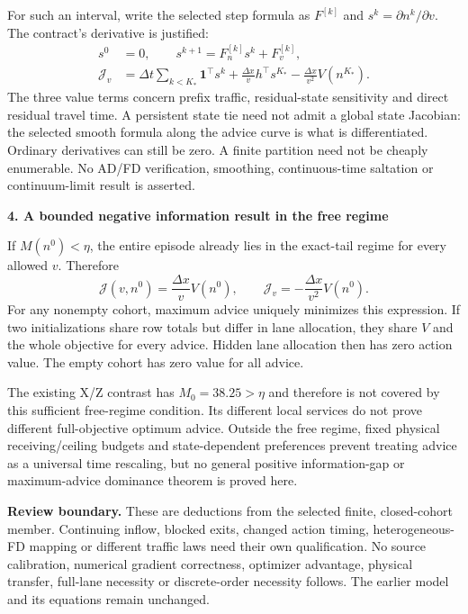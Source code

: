 \documentclass[10pt,a4paper]{article}
\newcommand{\head}[1]{\par\medskip\textbf{#1}\par}
\begin{document}
For such an interval, write the selected step formula as $F^{[k]}$ and
$s^k=\partial n^k/\partial v$. The contract's derivative is justified:
\begin{align}
 s^0&=0,\qquad
 s^{k+1}=F_n^{[k]}s^k+F_v^{[k]},\nonumber\\
 \mathcal J_v&=\Delta t\sum_{k<K_*}\mathbf1^\top s^k
       +\frac{\Delta x}{v}h^\top s^{K_*}
       -\frac{\Delta x}{v^2}V(n^{K_*}). \label{eq:derivative}
\end{align}
The three value terms concern prefix traffic, residual-state sensitivity
and direct residual travel time. A persistent state tie need not admit a
global state Jacobian: the selected smooth formula along the advice curve
is what is differentiated. Ordinary derivatives can still be zero. A finite
partition need not be cheaply enumerable. No AD/FD verification, smoothing,
continuous-time saltation or continuum-limit result is asserted.

\head{4. A bounded negative information result in the free regime}
If $M(n^0)<\eta$, the entire episode already lies in the exact-tail regime
for every allowed $v$. Therefore
\begin{equation}
 \mathcal J(v,n^0)=\frac{\Delta x}{v}V(n^0),\qquad
 \mathcal J_v=-\frac{\Delta x}{v^2}V(n^0).
 \label{eq:free}
\end{equation}
For any nonempty cohort, maximum advice uniquely minimizes this expression.
If two initializations share row totals but differ in lane allocation, they
share $V$ and the whole objective for every advice. Hidden lane allocation
then has zero action value. The empty cohort has zero value for all advice.

The existing X/Z contrast has $M_0=38.25>\eta$ and therefore is not covered
by this sufficient free-regime condition. Its different local services do
not prove different full-objective optimum advice. Outside the free regime,
fixed physical receiving/ceiling budgets and state-dependent preferences
prevent treating advice as a universal time rescaling, but no general
positive information-gap or maximum-advice dominance theorem is proved here.

\textbf{Review boundary.} These are deductions from the selected finite,
closed-cohort member. Continuing inflow, blocked exits, changed action timing,
heterogeneous-FD mapping or different traffic laws need their own qualification.
No source calibration, numerical gradient correctness, optimizer advantage,
physical transfer, full-lane necessity or discrete-order necessity follows.
The earlier model and its equations remain unchanged.
\end{document}
